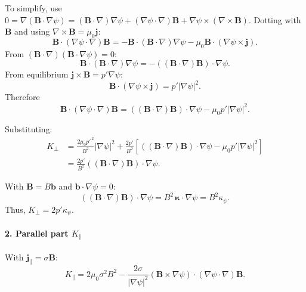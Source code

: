 \documentclass[10pt,a4paper]{article}
\numberwithin{equation}{section}
\begin{document}
To simplify, use $0=\nabla(\mathbf B\cdot\nabla\psi) = (\mathbf B\cdot\nabla)\nabla\psi + (\nabla\psi\cdot\nabla)\mathbf B + \nabla\psi\times(\nabla\times\mathbf B)$.
Dotting with $\mathbf B$ and using $\nabla\times\mathbf B=\mu_{0}\mathbf j$:
\begin{equation}
\mathbf B\cdot(\nabla\psi\cdot\nabla)\mathbf B = -\mathbf B\cdot(\mathbf B\cdot\nabla)\nabla\psi - \mu_{0}\mathbf B\cdot(\nabla\psi\times\mathbf j).
\end{equation}
From $(\mathbf B\cdot\nabla)(\mathbf B\cdot\nabla\psi)=0$:
\begin{equation}
\mathbf B\cdot(\mathbf B\cdot\nabla)\nabla\psi = -((\mathbf B\cdot\nabla)\mathbf B)\cdot\nabla\psi.
\end{equation}
From equilibrium $\mathbf j\times\mathbf B=p'\nabla\psi$:
\begin{equation}
\mathbf B\cdot(\nabla\psi\times\mathbf j) = p'|\nabla\psi|^{2}.
\end{equation}
Therefore
\begin{equation}
\mathbf B\cdot(\nabla\psi\cdot\nabla)\mathbf B = ((\mathbf B\cdot\nabla)\mathbf B)\cdot\nabla\psi - \mu_{0}p'|\nabla\psi|^{2}.
\end{equation}

Substituting:
\begin{align}
K_{\perp} &= \frac{2\mu_{0}p'^{\,2}}{B^{2}}|\nabla\psi|^{2} + \frac{2p'}{B^{2}}\left[((\mathbf B\cdot\nabla)\mathbf B)\cdot\nabla\psi - \mu_{0}p'|\nabla\psi|^{2}\right] \\
&= \frac{2p'}{B^{2}}((\mathbf B\cdot\nabla)\mathbf B)\cdot\nabla\psi.
\end{align}

With $\mathbf B=B\mathbf b$ and $\mathbf b\cdot\nabla\psi=0$:
\begin{equation}
((\mathbf B\cdot\nabla)\mathbf B)\cdot\nabla\psi = B^2\,\boldsymbol{\kappa}\cdot\nabla\psi = B^2\kappa_\psi.
\end{equation}
Thus, $\boxed{K_{\perp}=2p'\kappa_\psi}$.

\paragraph{2. Parallel part $K_{\parallel}$}
With $\mathbf j_{\parallel}=\sigma\mathbf B$:
\begin{equation}
K_{\parallel} = 2\mu_0\sigma^2B^2 - \frac{2\sigma}{|\nabla\psi|^2}(\mathbf B\times\nabla\psi)\cdot(\nabla\psi\cdot\nabla)\mathbf B.
\end{equation}
\end{document}
